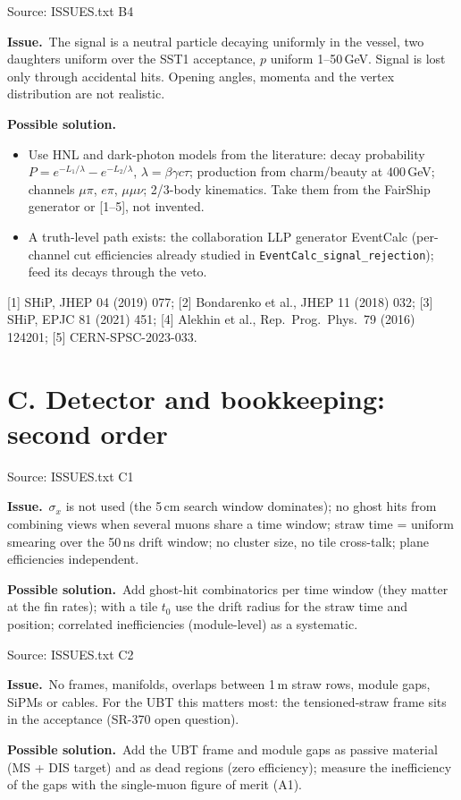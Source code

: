 \documentclass[10pt,a4paper]{article}
\newcommand{\st}[1]{\textbf{#1}}
\newcommand{\stOPEN}{\textcolor{shorange}{\st{OPEN}}}
\newenvironment{issue}[5]{%
  \begin{tcolorbox}[breakable,colback=white,colframe=cernblue,boxrule=0.6pt,arc=1.5mm,
    left=6pt,right=6pt,top=4pt,bottom=4pt,
    title={\textbf{#1}\quad #2\hfill{\normalfont\small priority #3\quad\colorbox{white}{#4}}},
    coltitle=white,colbacktitle=cernblue,fonttitle=\normalsize]
  {\color{greytxt}\footnotesize Source: #5}\par\smallskip}{\end{tcolorbox}\vspace{2pt}}
\newcommand{\prob}{\par\noindent\textbf{\color{cernblue}Issue.}\ }
\newcommand{\sol}{\par\smallskip\noindent\textbf{\color{shorange}Possible solution.}\ }
\begin{document}
\begin{issue}{B4}{Signal model}{B}{\stOPEN}{ISSUES.txt B4}
\prob The signal is a neutral particle decaying uniformly in the vessel, two daughters uniform over the SST1
acceptance, $p$ uniform 1--50\,GeV. Signal is lost only through accidental hits. Opening angles, momenta and the
vertex distribution are not realistic.
\sol
\begin{itemize}
\item Use HNL and dark-photon models from the literature: decay probability
      $P=e^{-L_1/\lambda}-e^{-L_2/\lambda}$, $\lambda=\beta\gamma c\tau$; production from charm/beauty at 400\,GeV;
      channels $\mu\pi$, $e\pi$, $\mu\mu\nu$; 2/3-body kinematics. Take them from the FairShip generator or
      [1--5], not invented.
\item A truth-level path exists: the collaboration LLP generator EventCalc (per-channel cut efficiencies already
      studied in \texttt{EventCalc\_signal\_rejection}); feed its decays through the veto.
\end{itemize}
{\footnotesize\color{greytxt}[1] SHiP, JHEP 04 (2019) 077; [2] Bondarenko et al., JHEP 11 (2018) 032;
[3] SHiP, EPJC 81 (2021) 451; [4] Alekhin et al., Rep.\ Prog.\ Phys.\ 79 (2016) 124201; [5] CERN-SPSC-2023-033.}
\end{issue}

\section*{C. Detector and bookkeeping: second order}

\begin{issue}{C1}{Detector response simplifications}{C}{\stOPEN}{ISSUES.txt C1}
\prob $\sigma_x$ is not used (the 5\,cm search window dominates); no ghost hits from combining views when several
muons share a time window; straw time = uniform smearing over the 50\,ns drift window; no cluster size, no tile
cross-talk; plane efficiencies independent.
\sol Add ghost-hit combinatorics per time window (they matter at the fin rates); with a tile $t_0$ use the
drift radius for the straw time and position; correlated inefficiencies (module-level) as a systematic.
\end{issue}

\begin{issue}{C2}{Dead material and dead regions}{C}{\stOPEN}{ISSUES.txt C2}
\prob No frames, manifolds, overlaps between 1\,m straw rows, module gaps, SiPMs or cables. For the UBT this
matters most: the tensioned-straw frame sits in the acceptance (SR-370 open question).
\sol Add the UBT frame and module gaps as passive material (MS + DIS target) and as dead regions (zero efficiency);
measure the inefficiency of the gaps with the single-muon figure of merit (A1).
\end{issue}
\end{document}
